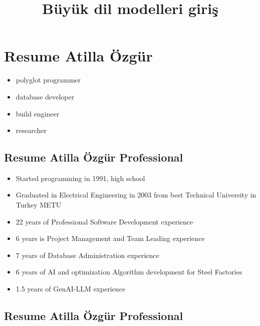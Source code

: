 \documentclass[
  letterpaper,
  DIV=11,
  numbers=noendperiod]{scrartcl}
\title{Büyük dil modelleri giriş}
\author{}
\date{}
\providecommand{\tightlist}{%
  \setlength{\itemsep}{0pt}\setlength{\parskip}{0pt}}
\begin{document}
\maketitle


\section{Resume Atilla Özgür}\label{resume-atilla-uxf6zguxfcr}

\begin{itemize}
\tightlist
\item
  polyglot programmer
\item
  database developer
\item
  build engineer
\item
  researcher
\end{itemize}

\subsection{Resume Atilla Özgür
Professional}\label{resume-atilla-uxf6zguxfcr-professional}

\begin{itemize}
\tightlist
\item
  Started programming in 1991, high school
\item
  Graduated in Electrical Engineering in 2003 from best Technical
  University in Turkey METU
\item
  22 years of Professional Software Development experience
\item
  6 years is Project Management and Team Leading experience
\item
  7 years of Database Administration experience
\item
  6 years of AI and optimization Algorithm development for Steel
  Factories
\item
  1.5 years of GenAI-LLM experience
\end{itemize}

\subsection{Resume Atilla Özgür
Professional}\label{resume-atilla-uxf6zguxfcr-professional-1}
\end{document}
